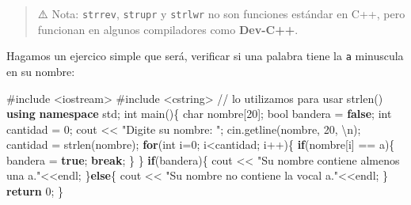 \documentclass[
  11pt,
  a4paper,
  DIV=11,
  numbers=noendperiod]{scrreprt}
\newenvironment{Shaded}{\begin{snugshade}}{\end{snugshade}}
\newcommand{\CharTok}[1]{\textcolor[rgb]{0.13,0.47,0.30}{#1}}
\newcommand{\CommentTok}[1]{\textcolor[rgb]{0.37,0.37,0.37}{#1}}
\newcommand{\ControlFlowTok}[1]{\textcolor[rgb]{0.00,0.23,0.31}{\textbf{#1}}}
\newcommand{\DataTypeTok}[1]{\textcolor[rgb]{0.68,0.00,0.00}{#1}}
\newcommand{\DecValTok}[1]{\textcolor[rgb]{0.68,0.00,0.00}{#1}}
\newcommand{\ImportTok}[1]{\textcolor[rgb]{0.00,0.46,0.62}{#1}}
\newcommand{\KeywordTok}[1]{\textcolor[rgb]{0.00,0.23,0.31}{\textbf{#1}}}
\newcommand{\NormalTok}[1]{\textcolor[rgb]{0.00,0.23,0.31}{#1}}
\newcommand{\OperatorTok}[1]{\textcolor[rgb]{0.37,0.37,0.37}{#1}}
\newcommand{\PreprocessorTok}[1]{\textcolor[rgb]{0.68,0.00,0.00}{#1}}
\newcommand{\SpecialCharTok}[1]{\textcolor[rgb]{0.37,0.37,0.37}{#1}}
\newcommand{\StringTok}[1]{\textcolor[rgb]{0.13,0.47,0.30}{#1}}
\begin{document}
\begin{quote}
⚠️ Nota: \texttt{strrev}, \texttt{strupr} y \texttt{strlwr} no son
funciones estándar en C++, pero funcionan en algunos compiladores como
\textbf{Dev-C++}.
\end{quote}

Hagamos un ejercico simple que será, verificar si una palabra tiene la
\texttt{a} minuscula en su nombre:

\begin{Shaded}
\begin{Highlighting}[]
\PreprocessorTok{\#include }\ImportTok{\textless{}iostream\textgreater{}}
\PreprocessorTok{\#include }\ImportTok{\textless{}cstring\textgreater{}}\PreprocessorTok{ }\CommentTok{// lo utilizamos para usar strlen()}
\KeywordTok{using} \KeywordTok{namespace}\NormalTok{ std}\OperatorTok{;}
\DataTypeTok{int}\NormalTok{ main}\OperatorTok{()\{}
    \DataTypeTok{char}\NormalTok{ nombre}\OperatorTok{[}\DecValTok{20}\OperatorTok{];}
    \DataTypeTok{bool}\NormalTok{ bandera }\OperatorTok{=} \KeywordTok{false}\OperatorTok{;}
    \DataTypeTok{int}\NormalTok{ cantidad }\OperatorTok{=} \DecValTok{0}\OperatorTok{;}
\NormalTok{    cout }\OperatorTok{\textless{}\textless{}} \StringTok{"Digite su nombre: "}\OperatorTok{;}
\NormalTok{    cin}\OperatorTok{.}\NormalTok{getline}\OperatorTok{(}\NormalTok{nombre}\OperatorTok{,} \DecValTok{20}\OperatorTok{,} \CharTok{\textquotesingle{}}\SpecialCharTok{\textbackslash{}n}\CharTok{\textquotesingle{}}\OperatorTok{);}
\NormalTok{    cantidad }\OperatorTok{=}\NormalTok{ strlen}\OperatorTok{(}\NormalTok{nombre}\OperatorTok{);}
    \ControlFlowTok{for}\OperatorTok{(}\DataTypeTok{int}\NormalTok{ i}\OperatorTok{=}\DecValTok{0}\OperatorTok{;}\NormalTok{ i}\OperatorTok{\textless{}}\NormalTok{cantidad}\OperatorTok{;}\NormalTok{ i}\OperatorTok{++)\{}
        \ControlFlowTok{if}\OperatorTok{(}\NormalTok{nombre}\OperatorTok{[}\NormalTok{i}\OperatorTok{]} \OperatorTok{==} \CharTok{\textquotesingle{}a\textquotesingle{}}\OperatorTok{)\{}
\NormalTok{            bandera }\OperatorTok{=} \KeywordTok{true}\OperatorTok{;}
            \ControlFlowTok{break}\OperatorTok{;}
        \OperatorTok{\}}
    \OperatorTok{\}}
    \ControlFlowTok{if}\OperatorTok{(}\NormalTok{bandera}\OperatorTok{)\{}
\NormalTok{        cout }\OperatorTok{\textless{}\textless{}} \StringTok{"Su nombre contiene almenos una a."}\OperatorTok{\textless{}\textless{}}\NormalTok{endl}\OperatorTok{;}
    \OperatorTok{\}}\ControlFlowTok{else}\OperatorTok{\{}
\NormalTok{        cout }\OperatorTok{\textless{}\textless{}} \StringTok{"Su nombre no contiene la vocal a."}\OperatorTok{\textless{}\textless{}}\NormalTok{endl}\OperatorTok{;}
    \OperatorTok{\}}
    \ControlFlowTok{return} \DecValTok{0}\OperatorTok{;}
\OperatorTok{\}}
\end{Highlighting}
\end{Shaded}
\end{document}
